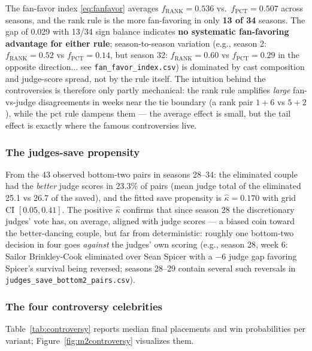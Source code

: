\documentclass[11pt]{article}
\begin{document}
The fan-favor index \eqref{eq:fanfavor} averages $f_{\text{RANK}} = \mathbf{0.536}$ vs.\
$f_{\text{PCT}} = \mathbf{0.507}$ across seasons, and the rank rule is the more
fan-favoring in only \textbf{13 of 34} seasons. The gap of 0.029 with 13/34 sign balance
indicates \textbf{no systematic fan-favoring advantage for either rule}; season-to-season
variation (e.g., season 2: $f_{\text{RANK}}=0.52$ vs $f_{\text{PCT}}=0.14$, but season
32: $f_{\text{RANK}}=0.60$ vs $f_{\text{PCT}}=0.29$ in the opposite direction... see
\texttt{fan\_favor\_index.csv}) is dominated by cast composition and judge-score spread,
not by the rule itself. The intuition behind the controversies is therefore only
partly mechanical: the rank rule amplifies \emph{large} fan-vs-judge disagreements in
weeks near the tie boundary (a rank pair $1{+}6$ vs $5{+}2$), while the pct rule
dampens them --- the average effect is small, but the tail effect is exactly where the
famous controversies live.

\subsubsection{The judges-save propensity}

From the 43 observed bottom-two pairs in seasons 28--34: the eliminated couple had the
\emph{better} judge scores in $23.3\%$ of pairs (mean judge total of the eliminated 25.1
vs 26.7 of the saved), and the fitted save propensity is
$\hat{\kappa} = \mathbf{0.170}$ with grid CI $[0.05, 0.41]$. The positive $\hat{\kappa}$
confirms that since season 28 the discretionary judges' vote has, on average, aligned
with judge scores --- a biased coin toward the better-dancing couple, but far from
deterministic: roughly one bottom-two decision in four goes \emph{against} the judges'
own scoring (e.g., season 28, week 6: Sailor Brinkley-Cook eliminated over Sean Spicer
with a $-6$ judge gap favoring Spicer's survival being reversed; seasons 28--29 contain
several such reversals in \texttt{judges\_save\_bottom2\_pairs.csv}).

\subsubsection{The four controversy celebrities}

Table~\ref{tab:controversy} reports median final placements and win probabilities per
variant; Figure~\ref{fig:m2controversy} visualizes them.
\end{document}

